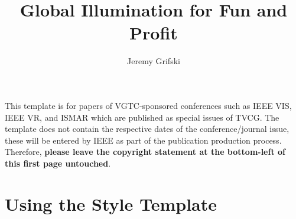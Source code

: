 \documentclass[journal]{vgtc}                %
\title{Global Illumination for Fun and Profit}
\author{Jeremy Grifski}
\begin{document}


\maketitle

This template is for papers of VGTC-sponsored conferences such as IEEE VIS, IEEE VR, and ISMAR which are published as special issues of TVCG. The template does not contain the respective dates of the conference/journal issue, these will be entered by IEEE as part of the publication production process. Therefore, \textbf{please leave the copyright statement at the bottom-left of this first page untouched}.

\section{Using the Style Template}
\end{document}
